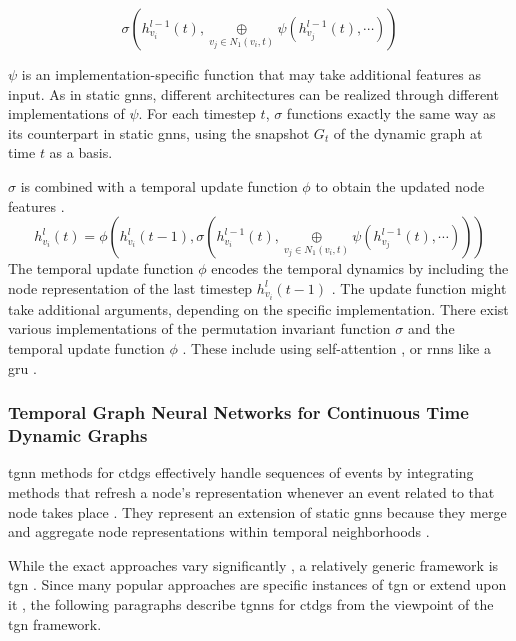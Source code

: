 \begin{equation}
    \sigma(h_{v_i}^{l-1}(t), \underset{v_j \in N_1(v_i, t)}{\oplus} \psi(h_{v_j}^{l-1}(t), \cdots))
\end{equation}

$\psi$ is an implementation-specific function that may take additional features as input. As in static \glspl{gnn}, different architectures can be realized through different implementations of $\psi$. For each timestep $t$, $\sigma$ functions exactly the same way as its counterpart in static \glspl{gnn}, using the snapshot $G_t$ of the dynamic graph at time $t$ as a basis.

$\sigma$ is combined with a temporal update function $\phi$ to obtain the updated node features \cite{you_roland_2022}.
\begin{equation}
    h_{v_i}^l(t) = \phi(h_{v_i}^{l}(t-1), \sigma(h_{v_i}^{l-1}(t), \underset{v_j \in N_1(v_i, t)}{\oplus} \psi(h_{v_j}^{l-1}(t), \cdots)))
\end{equation}
The temporal update function $\phi$ encodes the temporal dynamics by including the node representation of the last timestep $h_{v_i}^{l}(t-1)$ \cite{longa_graph_2023}. The update function might take additional arguments, depending on the specific implementation. There exist various implementations of the permutation invariant function $\sigma$ and the temporal update function $\phi$ \cite{longa_graph_2023}. These include using self-attention \cite{sankar_dysat_2020}, or \glspl{rnn} like a \gls{gru} \cite{you_roland_2022}.

\subsubsection{Temporal Graph Neural Networks for Continuous Time Dynamic Graphs}
\label{s_tgnns_for_ctdgs}
\gls{tgnn} methods for \glspl{ctdg} effectively handle sequences of events by integrating methods that refresh a node's representation whenever an event related to that node takes place \cite{longa_graph_2023}. They represent an extension of static \glspl{gnn} because they merge and aggregate node representations within temporal neighborhoods \cite{longa_graph_2023}.

While the exact approaches vary significantly \cite{longa_graph_2023}, a relatively generic framework is \gls{tgn} \cite{rossi_temporal_2020}. Since many popular approaches are specific instances of \gls{tgn} \cite{trivedi_dyrep_2019, rossi_temporal_2020} or extend upon it \cite{souza_provably_2022}, the following paragraphs describe \glspl{tgnn} for \glspl{ctdg} from the viewpoint of the \gls{tgn} framework.

